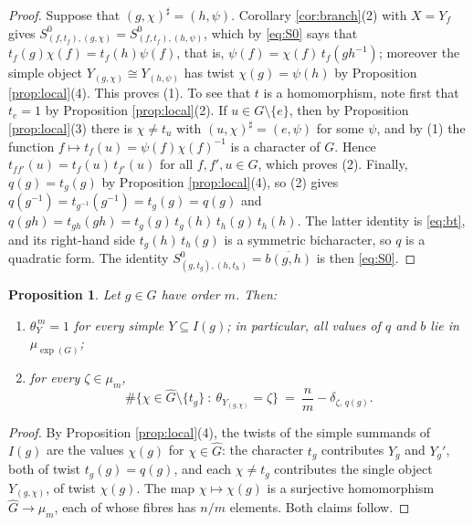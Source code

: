 \documentclass[10pt]{article}
\theoremstyle{plain}
\newtheorem{proposition}[theorem]{Proposition}
\theoremstyle{definition}
\theoremstyle{plain}
\begin{document}
\begin{proof}
Suppose that $(g,\chi)^\sharp=(h,\psi)$. Corollary \ref{cor:branch}(2) with $X=Y_f$ gives $S^0_{(f,t_f),(g,\chi)}=S^0_{(f,t_f),(h,\psi)}$, which by \eqref{eq:S0} says that $t_f(g)\chi(f)=t_f(h)\psi(f)$, that is, $\psi(f)=\chi(f)\,t_f(gh^{-1})$; moreover the simple object $Y_{(g,\chi)}\cong Y_{(h,\psi)}$ has twist $\chi(g)=\psi(h)$ by Proposition \ref{prop:local}(4). This proves (1). To see that $t$ is a homomorphism, note first that $t_e=1$ by Proposition \ref{prop:local}(2). If $u\in G\setminus\{e\}$, then by Proposition \ref{prop:local}(3) there is $\chi\neq t_u$ with $(u,\chi)^\sharp=(e,\psi)$ for some $\psi$, and by (1) the function $f\mapsto t_f(u)=\psi(f)\chi(f)^{-1}$ is a character of $G$. Hence $t_{ff'}(u)=t_f(u)\,t_{f'}(u)$ for all $f,f',u\in G$, which proves (2). Finally, $q(g)=t_g(g)$ by Proposition \ref{prop:local}(4), so (2) gives $q(g^{-1})=t_{g^{-1}}(g^{-1})=t_g(g)=q(g)$ and $q(gh)=t_{gh}(gh)=t_g(g)\,t_g(h)\,t_h(g)\,t_h(h)$. The latter identity is \eqref{eq:bt}, and its right-hand side $t_g(h)\,t_h(g)$ is a symmetric bicharacter, so $q$ is a quadratic form. The identity $S^0_{(g,t_g),(h,t_h)}=\overline{b(g,h)}$ is then \eqref{eq:S0}.
\end{proof}

\begin{proposition}\label{prop:block}
Let $g\in G$ have order $m$. Then:
\begin{enumerate}
\item $\theta_Y^{\,m}=1$ for every simple $Y\subseteq I(g)$; in particular, all values of $q$ and $b$ lie in $\mu_{\exp(G)}$;
\item for every $\zeta\in\mu_m$,
\begin{equation}\label{eq:fibre}
  \#\bigl\{\chi\in\widehat{G}\setminus\{t_g\}\ :\ \theta_{Y_{(g,\chi)}}=\zeta\bigr\}
  \ =\ \frac nm-\delta_{\zeta,\,q(g)} .
\end{equation}
\end{enumerate}
\end{proposition}

\begin{proof}
By Proposition \ref{prop:local}(4), the twists of the simple summands of $I(g)$ are the values $\chi(g)$ for $\chi\in\widehat{G}$: the character $t_g$ contributes $Y_g$ and $Y_g'$, both of twist $t_g(g)=q(g)$, and each $\chi\neq t_g$ contributes the single object $Y_{(g,\chi)}$, of twist $\chi(g)$. The map $\chi\mapsto\chi(g)$ is a surjective homomorphism $\widehat{G}\to\mu_m$, each of whose fibres has $n/m$ elements. Both claims follow.
\end{proof}
\end{document}
